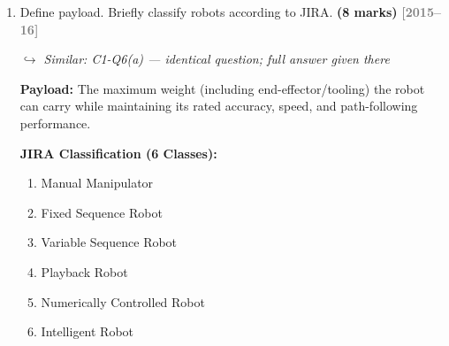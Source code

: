 \documentclass[12pt,a3paper]{article}
\newcommand{\yr}[1]{\hfill\textcolor{gray}{\small\textbf{[#1]}}}
\newcommand{\mk}[1]{\textcolor{orange!70!black}{\small\textbf{(#1 marks)}}}
\newcommand{\variant}[1]{\par\vspace{1pt}\textcolor{blue!50!black}%
  {\footnotesize\textit{$\hookrightarrow$ Similar: #1}}}
\begin{document}
\begin{enumerate}
\begin{tcolorbox}[enhanced,breakable,ansbox,colback=cA!4,colframe=cA,
  boxrule=0.8pt,arc=5pt,
  title={\textbf{Answer}},fonttitle=\bfseries\color{white},colbacktitle=cA]
\begin{center}
\end{center}

\textbf{Advantages:} Largest workspace-to-floor-space ratio; can reach above,
below, and around obstacles. \textbf{Disadvantages:} Complex kinematics;
multiple solutions for inverse kinematics; most complex to program offline.

\end{tcolorbox}

\item \label{qlabel:C1-Q16}
Define payload. Briefly classify robots according to JIRA. \mk{8}
\yr{2015--16}

\begin{tcolorbox}[enhanced,breakable,ansbox,colback=cA!4,colframe=cA,
  boxrule=0.8pt,arc=5pt,
  title={\textbf{Answer}},fonttitle=\bfseries\color{white},colbacktitle=cA]

\variant{C1-Q6(a) — identical question; full answer given there}

\textbf{Payload:} The maximum weight (including end-effector/tooling) the robot
can carry while maintaining its rated accuracy, speed, and path-following
performance.

\textbf{JIRA Classification (6 Classes):}
\begin{enumerate}[leftmargin=*,itemsep=2pt,label=\textbf{Class \arabic*:}]
  \item Manual Manipulator
  \item Fixed Sequence Robot
  \item Variable Sequence Robot
  \item Playback Robot
  \item Numerically Controlled Robot
  \item Intelligent Robot
\end{enumerate}


\end{tcolorbox}
\end{enumerate}
\end{document}
